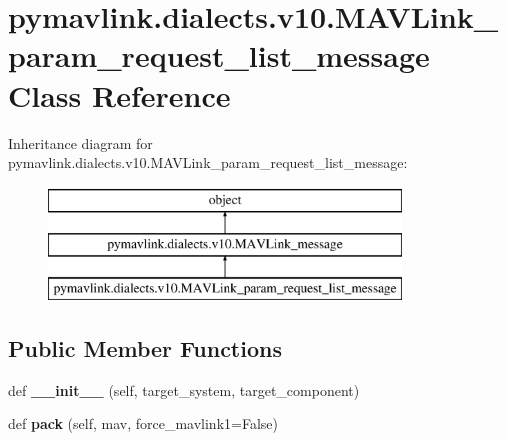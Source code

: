 \hypertarget{classpymavlink_1_1dialects_1_1v10_1_1MAVLink__param__request__list__message}{}\section{pymavlink.\+dialects.\+v10.\+M\+A\+V\+Link\+\_\+param\+\_\+request\+\_\+list\+\_\+message Class Reference}
\label{classpymavlink_1_1dialects_1_1v10_1_1MAVLink__param__request__list__message}
Inheritance diagram for pymavlink.\+dialects.\+v10.\+M\+A\+V\+Link\+\_\+param\+\_\+request\+\_\+list\+\_\+message\+:\begin{figure}[H]
\begin{center}
\leavevmode
\includegraphics[height=3.000000cm]{classpymavlink_1_1dialects_1_1v10_1_1MAVLink__param__request__list__message}
\end{center}
\end{figure}
\subsection*{Public Member Functions}
\begin{DoxyCompactItemize}
\item 
\mbox{\label{classpymavlink_1_1dialects_1_1v10_1_1MAVLink__param__request__list__message_acaecf74a1755fb1e7d8ccce31eaa39fc}} 
def {\bfseries \+\_\+\+\_\+init\+\_\+\+\_\+} (self, target\+\_\+system, target\+\_\+component)
\item 
\mbox{\label{classpymavlink_1_1dialects_1_1v10_1_1MAVLink__param__request__list__message_ab7826d0f57b0078f10cf935a71d63dd8}} 
def {\bfseries pack} (self, mav, force\+\_\+mavlink1=False)
\end{DoxyCompactItemize}
